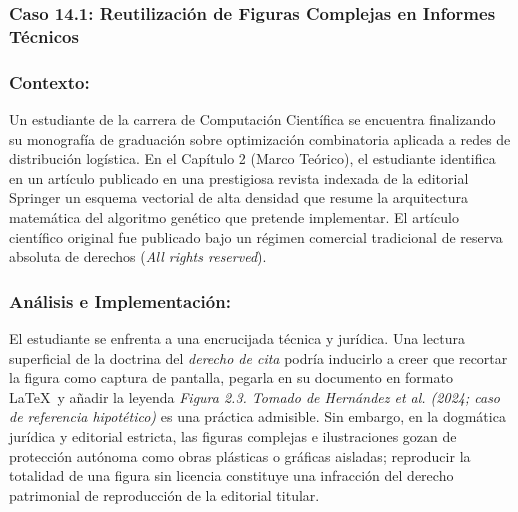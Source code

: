 \subsubsection{Caso 14.1: Reutilización de Figuras Complejas en Informes Técnicos}

\subsubsection*{Contexto:}
Un estudiante de la carrera de Computación Científica se encuentra finalizando su monografía de graduación sobre optimización combinatoria aplicada a redes de distribución logística. En el Capítulo 2 (Marco Teórico), el estudiante identifica en un artículo publicado en una prestigiosa revista indexada de la editorial Springer un esquema vectorial de alta densidad que resume la arquitectura matemática del algoritmo genético que pretende implementar. El artículo científico original fue publicado bajo un régimen comercial tradicional de reserva absoluta de derechos (\textit{All rights reserved}).

\subsubsection*{Análisis e Implementación:}
El estudiante se enfrenta a una encrucijada técnica y jurídica. Una lectura superficial de la doctrina del \textit{derecho de cita} podría inducirlo a creer que recortar la figura como captura de pantalla, pegarla en su documento en formato \LaTeX\ y añadir la leyenda \textsl{\guillemotleft Figura 2.3. Tomado de Hernández et al. (2024; caso de referencia hipotético)\guillemotright} es una práctica admisible. Sin embargo, en la dogmática jurídica y editorial estricta, las figuras complejas e ilustraciones gozan de protección autónoma como obras plásticas o gráficas aisladas; reproducir la totalidad de una figura sin licencia constituye una infracción del derecho patrimonial de reproducción de la editorial titular.

